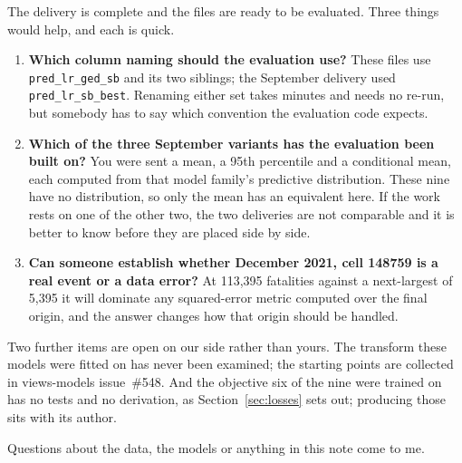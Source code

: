 The delivery is complete and the files are ready to be evaluated. Three things would help, and
each is quick.

\begin{enumerate}
    \item \textbf{Which column naming should the evaluation use?} These files use
          \texttt{pred\_lr\_ged\_sb} and its two siblings; the September delivery used
          \texttt{pred\_lr\_sb\_best}. Renaming either set takes minutes and needs no re-run, but
          somebody has to say which convention the evaluation code expects.
    \item \textbf{Which of the three September variants has the evaluation been built on?} You
          were sent a mean, a 95th percentile and a conditional mean, each computed from that
          model family's predictive distribution. These nine have no distribution, so only the
          mean has an equivalent here. If the work rests on one of the other two, the two
          deliveries are not comparable and it is better to know before they are placed side by
          side.
    \item \textbf{Can someone establish whether December 2021, cell 148759 is a real event or a
          data error?} At 113,395 fatalities against a next-largest of 5,395 it will dominate any
          squared-error metric computed over the final origin, and the answer changes how that
          origin should be handled.
\end{enumerate}

\noindent Two further items are open on our side rather than yours. The transform these models
were fitted on has never been examined; the starting points are collected in views-models
issue~\#548. And the objective six of the nine were trained on has no tests and no derivation, as
Section~\ref{sec:losses} sets out; producing those sits with its author.

Questions about the data, the models or anything in this note come to me.

